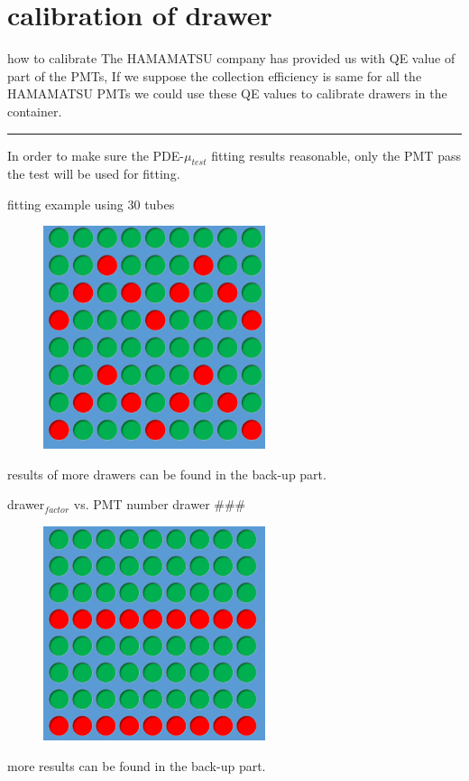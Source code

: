 \documentclass[11pt,compress,xcolor=x11names,UTF8]{beamer}
\begin{document}
\section{calibration of drawer}
\begin{frame}{how to calibrate}
The HAMAMATSU company has provided us with QE value of part of the PMTs, If we suppose the collection efficiency is same for all the HAMAMATSU PMTs we could use these QE values to calibrate drawers in the container.

\vspace{.5cm}
\hrule{\textwidth}
\vspace{.5cm}
In order to make sure the PDE-$\mu_{test}$ fitting results reasonable, only the PMT pass the test will be used for fitting.
\end{frame}
\begin{frame}{fitting example using 30 tubes}
\begin{figure}
\centering
\includegraphics[width=0.58\textwidth]{pat5} %
\end{figure}
results of more drawers can be found in the back-up part.
\end{frame}
\begin{frame}{drawer$_{factor}$ vs. PMT number drawer ###}
\begin{figure}
\centering
\includegraphics[width=0.58\textwidth]{pat3} %
\end{figure}
more results can be found in the back-up part.
\end{frame}
\end{document}
